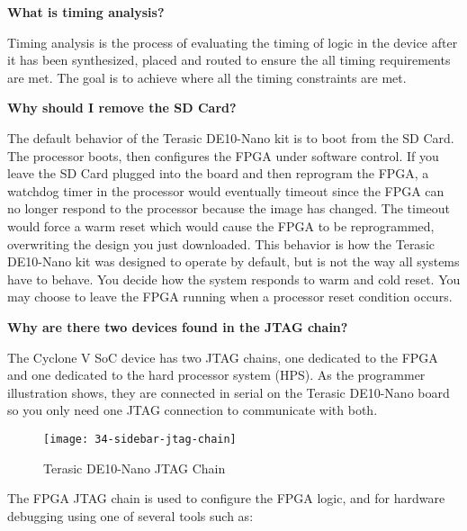 \begin{flushleft}
\hypertarget{side6}{\textbf{What is timing analysis?}}
\newline
Timing analysis is the process of evaluating the timing of logic in the device after it has been synthesized, placed and routed to ensure the all timing requirements are met. The goal is to achieve  where all the timing constraints are met.
\newline

\hypertarget{side7}{\textbf{Why should I remove the SD Card?}}
\newline
The default behavior of the Terasic DE10-Nano kit is to boot from the SD Card. The processor boots, then configures the FPGA under software control. If you leave the SD Card plugged into the board and then reprogram the FPGA, a watchdog timer in the processor would eventually timeout since the FPGA can no longer respond to the processor because the image has changed. The timeout would force a warm reset which would cause the FPGA to be reprogrammed, overwriting the  design you just downloaded.
\newline
\newline
This behavior is how the Terasic DE10-Nano kit was designed to operate by default, but is not the way all systems have to behave. You decide how the system responds to warm and cold reset. You may choose to leave the FPGA running  when a processor reset condition occurs.
\newline

\hypertarget{side8}{\textbf{Why are there two devices found in the JTAG chain?}}
\newline
The Cyclone V SoC device has two JTAG chains, one dedicated to the FPGA and one dedicated to the hard processor system (HPS). As the programmer illustration shows, they are connected in serial on the Terasic DE10-Nano board so you only need one JTAG connection to communicate with both.

\begin{figure}[H]
\centering
\texttt{[image: 34-sidebar-jtag-chain]}
\caption{Terasic DE10-Nano JTAG Chain}
\label{fig:34-sidebar-jtag-chain}
\end{figure}

The FPGA JTAG chain is used to configure the FPGA logic, and for hardware debugging using one of several tools such as:


\end{flushleft}
